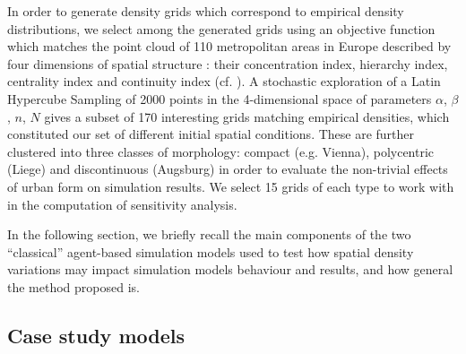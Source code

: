 \documentclass[Afour,sageh,times]{sagej}
\begin{document}

In order to generate density grids which correspond to empirical density distributions, we select among the generated grids using an objective function which matches the point cloud of 110 metropolitan areas in Europe described by four dimensions of spatial structure : their concentration index, hierarchy index, centrality index and continuity index (cf. \cite{LeNechet2015}). A stochastic exploration of a Latin Hypercube Sampling of 2000 points in the 4-dimensional space of parameters {$\alpha$, $\beta$, $n$, $N$} gives a subset of 170 interesting grids matching empirical densities, which constituted our set of different initial spatial conditions. These are further clustered into three classes of morphology: compact (e.g. Vienna), polycentric (Liege) and discontinuous (Augsburg) in order to evaluate the non-trivial effects of urban form on simulation results. We select 15 grids of each type to work with in the computation of sensitivity analysis.  






In the following section, we briefly recall the main components of the two ``classical'' agent-based simulation models used to test how spatial density variations may impact simulation models behaviour and results, and how general the method proposed is.

\subsection{Case study models}
\end{document}
